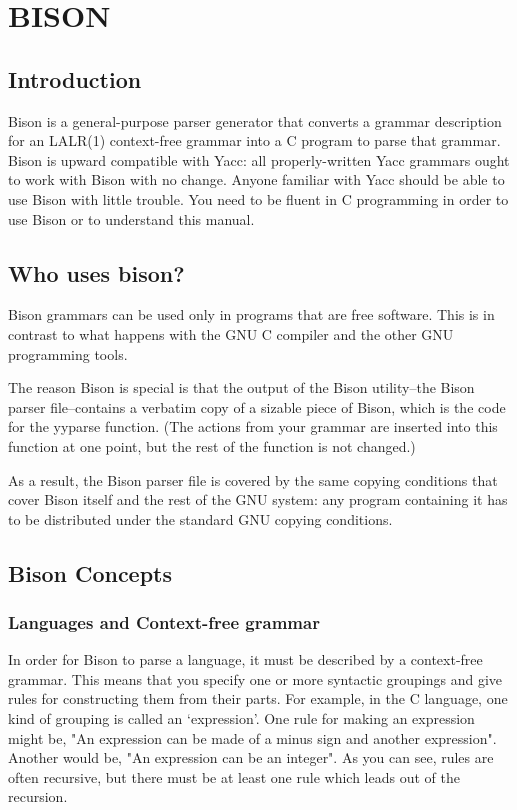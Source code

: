 \section{BISON}

\subsection{Introduction}

Bison is a general-purpose parser generator that converts a grammar description for an LALR(1) context-free grammar into a C program to parse that grammar.
Bison is upward compatible with Yacc: all properly-written Yacc grammars ought to work with Bison with no change. Anyone familiar with Yacc should be able to use Bison with little trouble. You need to be fluent in C programming in order to use Bison or to understand this manual.

\subsection{Who uses bison?}

Bison grammars can be used only in programs that are free software. This is in contrast to what happens with the GNU C compiler and the other GNU programming tools.

The reason Bison is special is that the output of the Bison utility--the Bison parser file--contains a verbatim copy of a sizable piece of Bison, which is the code for the yyparse function. (The actions from your grammar are inserted into this function at one point, but the rest of the function is not changed.)

As a result, the Bison parser file is covered by the same copying conditions that cover Bison itself and the rest of the GNU system: any program containing it has to be distributed under the standard GNU copying conditions.

\subsection{Bison Concepts}

\subsubsection{Languages and Context-free grammar}
In order for Bison to parse a language, it must be described by a context-free grammar. This means that you specify one or more syntactic groupings and give rules for constructing them from their parts. For example, in the C language, one kind of grouping is called an `expression'. One rule for making an expression might be, "An expression can be made of a minus sign and another expression". Another would be, "An expression can be an integer". As you can see, rules are often recursive, but there must be at least one rule which leads out of the recursion.

